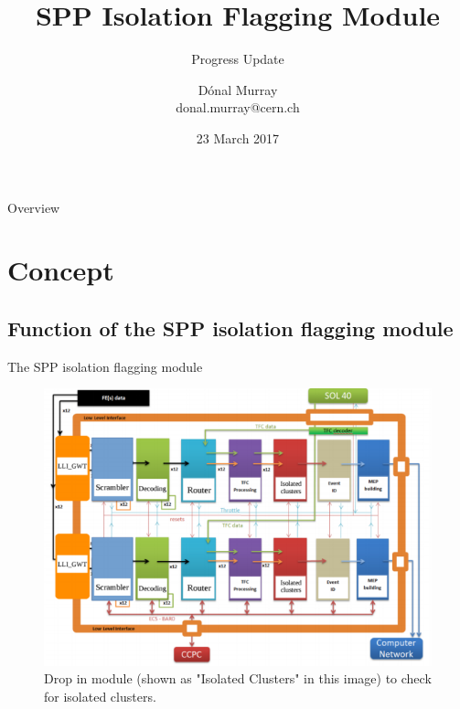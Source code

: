 \documentclass{beamer}
\title{SPP Isolation Flagging Module}
\subtitle{Progress Update}
\author[Dónal Murray\hspace*{80pt}donal.murray@cern.ch]{Dónal Murray \\
  \vskip7pt
  \tiny{donal.murray@cern.ch}
}
\institute{}
\date{23 March 2017}
\begin{document}
{
\begin{frame}
  \titlepage
\end{frame}
}
\addtocounter{framenumber}{-1} %

\begin{frame}{Overview}
  \tableofcontents
\end{frame}





\section{Concept}

\subsection{Function of the SPP isolation flagging module}

\begin{frame}{The SPP isolation flagging module}
  \begin{figure}
    \includegraphics[scale=0.3]{Overview}
    \caption{\centering Drop in module (shown as "Isolated Clusters" in this image) to check for isolated clusters.}
  \end{figure}
\end{frame}
\end{document}
